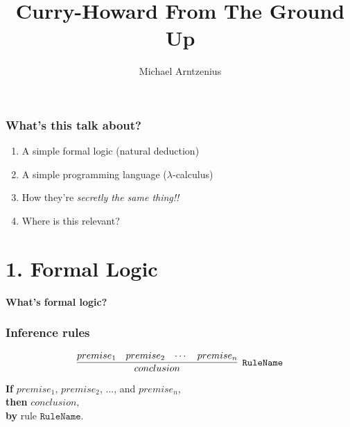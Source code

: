 \documentclass{beamer}
\title{Curry-Howard From The Ground Up}
\author{Michael Arntzenius}
\begin{document}

\begin{frame}
  \titlepage
\end{frame}


\begin{frame}
  \frametitle{What's this talk about?}
  \begin{enumerate}
  \item A simple formal logic (natural deduction)
  \item A simple programming language ($\lambda$-calculus)
  \item How they're \textit{secretly the same thing!!}
  \item Where is this relevant? %
  \end{enumerate}
\end{frame}


\section{1. Formal Logic}


\begin{frame}

  \begin{center}
    {\Large\bf What's formal logic?}
  \end{center}

\end{frame}

\newcommand{\rn}[1]{\ensuremath{\mathtt{#1}}}

\begin{frame}
  \frametitle{Inference rules}


  \[
  \infer[\rn{RuleName}]{conclusion}{premise_1 & premise_2 & \cdots & premise_n}
  \]

  \textbf{If} $premise_1$, $premise_2$, ..., and $premise_n$,\\
  \textbf{then} $conclusion$,\\
  \textbf{by} rule $\rn{RuleName}$.
\end{frame}
\end{document}
